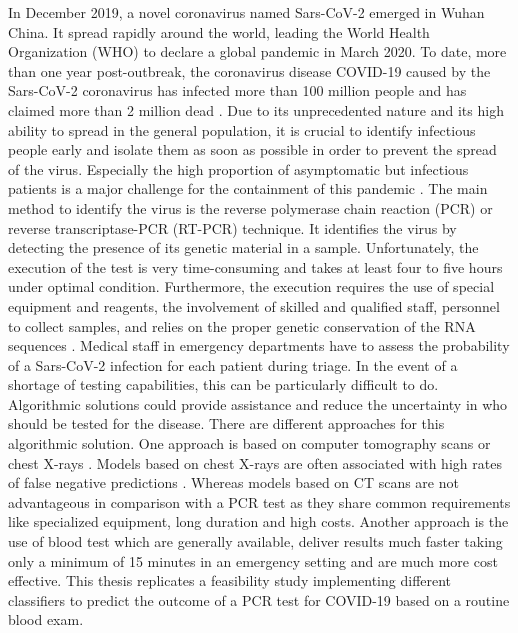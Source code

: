 In December 2019, a novel coronavirus named Sars-CoV-2 emerged in Wuhan China. 
It spread rapidly around the world, leading the World Health Organization (WHO) 
to declare a global pandemic in March 2020. To date, more than one year 
post-outbreak, the coronavirus disease COVID-19 caused by the Sars-CoV-2 
coronavirus has infected more than 100 million people and has claimed more than 
2 million dead \cite{RN204}. Due to its unprecedented nature and its high 
ability to spread in the general population, it is crucial to identify 
infectious people early and isolate them as soon as possible in order to 
prevent the spread of the virus. Especially the high proportion of asymptomatic 
but infectious patients is a major challenge for the containment of this 
pandemic \cite{RN205}. The main method to identify the virus is the reverse 
polymerase chain reaction (PCR) or reverse transcriptase-PCR (RT-PCR) 
technique. It identifies the virus by detecting the presence of its genetic 
material in a sample. Unfortunately, the execution of the test is very 
time-consuming and takes at least four to five hours under optimal condition. 
Furthermore, the execution requires the use of special equipment and reagents, 
the involvement of skilled and qualified staff, personnel to collect samples, 
and relies on the proper genetic conservation of the RNA sequences 
\cite{RN201, RN202}.
Medical staff in emergency departments have to assess the probability of a 
Sars-CoV-2 infection for each patient during triage. In the event of a shortage 
of testing capabilities, this can be particularly difficult to do. Algorithmic 
solutions could provide assistance and reduce the uncertainty in who should be 
tested for the disease. There are different approaches for this algorithmic 
solution.
One approach is based on computer tomography scans or chest X-rays 
\cite{RN200}. Models based on chest X-rays are often associated with high rates 
of false negative predictions \cite{RN200, RN206}. Whereas models based on CT 
scans are not advantageous in comparison with a PCR test as they share common 
requirements like specialized equipment, long duration and high costs.
Another approach is the use of blood test which are generally available, 
deliver results much faster taking only a minimum of 15 minutes in an emergency 
setting and are much more cost effective.
This thesis replicates a feasibility study implementing different classifiers 
to predict the outcome of a PCR test for COVID-19 based on a routine blood exam.
